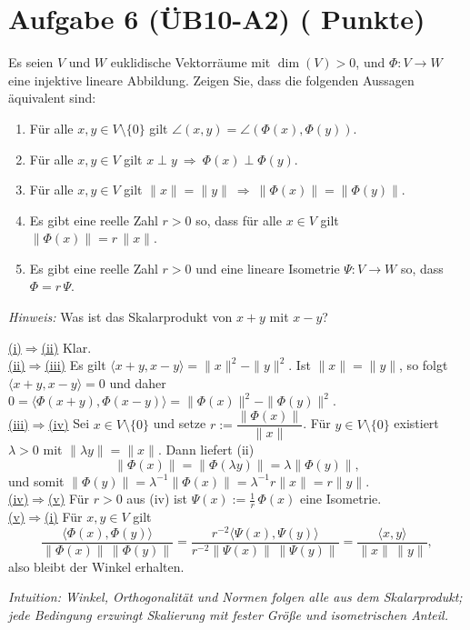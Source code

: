 \documentclass[11pt, a4paper]{article}
\newcommand{\aufgabe}[2]{%
  \section*{\Large\bfseries Aufgabe #1%
  \if\relax\detokenize{#2}\relax\else \hfill\normalfont\normalsize(#2 Punkte)\fi}%
  \vspace{-1.5ex}
}
\begin{document}
\aufgabe{6 (ÜB10-A2)}{}
Es seien $V$ und $W$ euklidische Vektorräume mit $\dim(V)>0$, und $\Phi:V\to W$ eine injektive lineare Abbildung. Zeigen Sie, dass die folgenden Aussagen äquivalent sind:
\begin{enumerate}
  \item Für alle $x,y\in V\setminus\{0\}$ gilt $\angle(x,y)=\angle(\Phi(x),\Phi(y))$.
  \item Für alle $x,y\in V$ gilt $x\perp y\ \Rightarrow\ \Phi(x)\perp \Phi(y)$.
  \item Für alle $x,y\in V$ gilt $\|x\|=\|y\|\ \Rightarrow\ \|\Phi(x)\|=\|\Phi(y)\|$.
  \item Es gibt eine reelle Zahl $r>0$ so, dass für alle $x\in V$ gilt $\|\Phi(x)\|=r\,\|x\|$.
  \item Es gibt eine reelle Zahl $r>0$ und eine lineare Isometrie $\Psi:V\to W$ so, dass $\Phi=r\,\Psi$.
\end{enumerate}
\emph{Hinweis:} Was ist das Skalarprodukt von $x+y$ mit $x-y$?
\begin{framed}


\underline{(i)$\Rightarrow$(ii)} Klar. \\
\underline{(ii)$\Rightarrow$(iii)} Es gilt $\langle x+y,x-y\rangle=\|x\|^2-\|y\|^2$.
Ist $\|x\|=\|y\|$, so folgt $\langle x+y,x-y\rangle=0$ und daher
$0=\langle\Phi(x+y),\Phi(x-y)\rangle=\|\Phi(x)\|^2-\|\Phi(y)\|^2$. \\
\underline{(iii)$\Rightarrow$(iv)} Sei $x\in V\setminus\{0\}$ und setze
$r:=\dfrac{\|\Phi(x)\|}{\|x\|}$. Für $y\in V\setminus\{0\}$ existiert
$\lambda>0$ mit $\|\lambda y\|=\|x\|$. Dann liefert (ii)
\[
  \|\Phi(x)\|=\|\Phi(\lambda y)\|=\lambda\|\Phi(y)\|,
\]
und somit $\|\Phi(y)\|=\lambda^{-1}\|\Phi(x)\|=\lambda^{-1}r\|x\|
=r\|y\|$. \\
\underline{(iv)$\Rightarrow$(v)} Für $r>0$ aus (iv) ist
$\Psi(x):=\tfrac1r\,\Phi(x)$ eine Isometrie. \\
\underline{(v)$\Rightarrow$(i)} Für $x,y\in V$ gilt
\[
\frac{\langle \Phi(x),\Phi(y)\rangle}{\|\Phi(x)\|\,\|\Phi(y)\|}
=\frac{r^{-2}\langle \Psi(x),\Psi(y)\rangle}{r^{-2}\|\Psi(x)\|\,\|\Psi(y)\|}
=\frac{\langle x,y\rangle}{\|x\|\,\|y\|},
\]
also bleibt der Winkel erhalten.

\medskip\noindent\textit{Intuition: Winkel, Orthogonalität und Normen folgen alle aus dem Skalarprodukt; jede Bedingung erzwingt Skalierung mit fester Größe und isometrischen Anteil.}
\end{framed}
\end{document}
